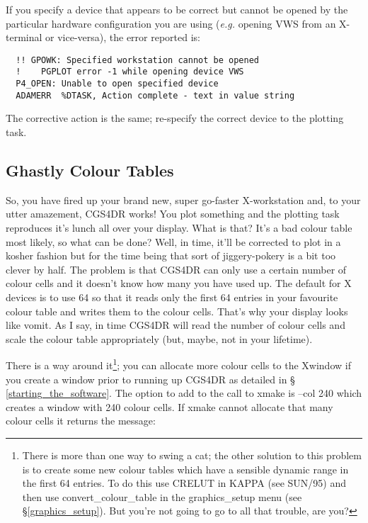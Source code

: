 {If you specify a device that appears to be correct but cannot be opened 
by the particular hardware configuration you are using ({\em e.g.} opening
VWS from an X-terminal or vice-versa), the error reported is:

\begin{verbatim}
  !! GPOWK: Specified workstation cannot be opened
  !    PGPLOT error -1 while opening device VWS
  P4_OPEN: Unable to open specified device
  ADAMERR  %DTASK, Action complete - text in value string
\end{verbatim}

The corrective action is the same; re-specify the correct device to the
plotting task.

\subsection{Ghastly Colour Tables}
\label{ghastly_colour_tables}

So, you have fired up your brand new, super go-faster X-workstation and, to
your utter amazement, CGS4DR works! You plot something and the plotting
task reproduces it's lunch all over your display. What is that? It's a
bad colour table most likely, so what can be done? Well, in time, it'll
be corrected to plot in a kosher fashion but for the time being that sort of
jiggery-pokery is a bit too clever by half. The problem is that
CGS4DR can only use a certain number of colour cells and it doesn't know
how many you have used up. The default for X devices is to use
64 so that it reads only the first 64 entries in your favourite colour
table and writes them to the colour cells. That's why your display looks like
vomit. As I say, in time CGS4DR will read the number of colour cells and
scale the colour table appropriately (but, maybe, not in your lifetime).

There is a way around it\footnote{There is more than one way to swing a cat; the other solution to
this problem is to create some new colour tables which have a sensible dynamic
range in the first 64 entries. To do this use {\sf CRELUT} in {\sf KAPPA} (see 
SUN/95) and then use {\sf convert\_colour\_table} in the {\sf graphics\_setup}
menu (see \S \ref{graphics_setup}). But you're not going to go to all that 
trouble, are you?}; you can allocate more colour cells to the Xwindow
if you create a window prior to running up CGS4DR as detailed in \S 
\ref{starting_the_software}.
The option to add to the call to {\sf xmake} is {\sf --col 240} which creates
a window with 240 colour cells. If {\sf xmake} cannot allocate that many 
colour cells it returns the message:

}
